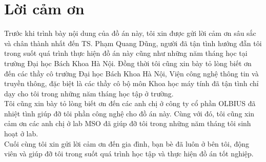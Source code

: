 \documentclass[a4paper,12pt]{report}
\renewcommand{\contentsname}{Mục lục}
\begin{document}
\chapter*{Lời cảm ơn}
Trước khi trình bày nội dung của đồ án này, tôi xin được gửi lời cảm ơn sâu sắc và chân thành nhất đến TS. Phạm Quang Dũng, người đã tận tình hướng đẫn tôi trong suốt quá trình thực hiện đồ án này cũng như những năm tháng học tại trường Đại học Bách Khoa Hà Nội. Đồng thời tôi cũng xin bày tỏ lòng biết ơn đến các thầy cô trường Đại học Bách Khoa Hà Nội, Viện công nghệ thông tin và truyền thông, đặc biệt là các thầy cô bộ môn Khoa học máy tính đã tận tình chỉ dạy cho tôi trong những năm tháng học tập ở trường. \\ 

Tôi cũng xin bày tỏ lòng biết ơn đến các anh chị ở công ty cổ phần OLBIUS đã nhiệt tình giúp đỡ tôi phần công nghệ cho đồ án này. Cùng với đó, tôi cũng xin cảm ơn các anh chị ở lab MSO đã giúp đỡ tôi trong những năm tháng tôi sinh hoạt ở lab.\\

Cuối cùng tôi xin gửi lời cảm ơn đến gia đình, bạn bè đã luôn ở bên tôi, động viên và giúp đỡ tôi trong suốt quá trình học tập và thực hiện đồ án tốt nghiệp. 
\newpage
\pdfbookmark{\contentsname}{toc}

\tableofcontents
\newpage
{}
\end{document}
